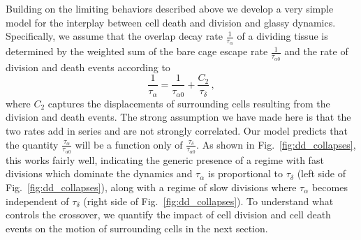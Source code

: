 \documentclass[
reprint
,aps
,amssymb
,amsmath
,superscriptaddress
]{revtex4-1}
\begin{document}
Building on the limiting behaviors described above%
we develop a very simple model for the interplay between cell death and division and glassy dynamics. Specifically, we assume that the overlap decay rate $\frac{1}{\tau_\alpha}$ of a dividing tissue is determined by the weighted sum of the bare cage escape rate $\frac{1}{\tau_{\alpha0}}$ and the rate of division and death events according to
%
\begin{equation}\label{eq:dd_taualpha1}
\frac{1}{\tau_\alpha} =   \frac{1}{\tau_{\alpha0}} + \frac{C_2}{\tau_\delta}  \, ,
\end{equation}
%
where $C_2$ captures the displacements of surrounding cells resulting from the division and death events. %
The strong assumption we have made here is that the two rates add in series and are not strongly correlated.
Our model predicts that the quantity $\frac{\tau_\alpha}{\tau_{\alpha0}}$ will be a function only of  $\frac{\tau_{\delta}}{ \tau_{\alpha0}}$. 
As shown in Fig.~\ref{fig:dd_collapses}, this works fairly well, indicating the generic presence of a regime with fast divisions which dominate the dynamics and $\tau_\alpha$ is proportional to $\tau_\delta$ (left side of Fig.~\ref{fig:dd_collapses}), along with a regime of slow divisions where $\tau_\alpha $ becomes independent of $ \tau_\delta$ (right side of Fig.~\ref{fig:dd_collapses}). To understand what controls the crossover, we quantify the impact of cell division and cell death events on the motion of surrounding cells in the next section. 

\end{document}
